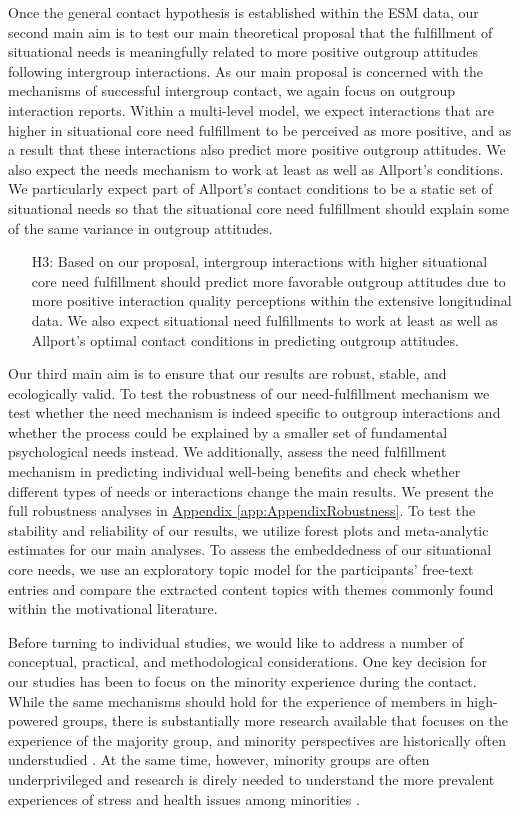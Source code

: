 \documentclass[man, 12pt, a4paper, mask]{apa7}
\theoremstyle{break}
\theoremstyle{plain}
\newcommand{\appref}[2][]{\hyperref[#2]{Appendix \ref*{#2}#1}}
\begin{document}
Once the general contact hypothesis is established within the ESM data, our second main aim is to test our main theoretical proposal that the fulfillment of situational needs is meaningfully related to more positive outgroup attitudes following intergroup interactions. As our main proposal is concerned with the mechanisms of successful intergroup contact, we again focus on outgroup interaction reports. Within a multi-level model, we expect interactions that are higher in situational core need fulfillment to be perceived as more positive, and as a result that these interactions also predict more positive outgroup attitudes. We also expect the needs mechanism to work at least as well as Allport's conditions. We particularly expect part of Allport's contact conditions to be a static set of situational needs so that the situational core need fulfillment should explain some of the same variance in outgroup attitudes.
\begin{enumerate}[leftmargin=1.5\parindent]
    \item[H3:] Based on our proposal, intergroup interactions with higher situational core need fulfillment should predict more favorable outgroup attitudes due to more positive interaction quality perceptions within the extensive longitudinal data. We also expect situational need fulfillments to work at least as well as Allport's optimal contact conditions in predicting outgroup attitudes.
\end{enumerate}

Our third main aim is to ensure that our results are robust, stable, and ecologically valid. To test the robustness of our need-fulfillment mechanism we test whether the need mechanism is indeed specific to outgroup interactions and whether the process could be explained by a smaller set of fundamental psychological needs instead. We additionally, assess the need fulfillment mechanism in predicting individual well-being benefits and check whether different types of needs or interactions change the main results. We present the full robustness analyses in \appref{app:AppendixRobustness}. To test the stability and reliability of our results, we utilize forest plots and meta-analytic estimates for our main analyses. To assess the embeddedness of our situational core needs, we use an exploratory topic model for the participants' free-text entries and compare the extracted content topics with themes commonly found within the motivational literature.

Before turning to individual studies, we would like to address a number of conceptual, practical, and methodological considerations. One key decision for our studies has been to focus on the minority experience during the contact. While the same mechanisms should hold for the experience of members in high-powered groups, there is substantially more research available that focuses on the experience of the majority group, and minority perspectives are historically often understudied \citep[e.g.,][]{Dovidio2017}. At the same time, however, minority groups are often underprivileged and research is direly needed to understand the more prevalent experiences of stress and health issues among minorities \citep[e.g.,][]{alvidrez2019}. 
\end{document}

